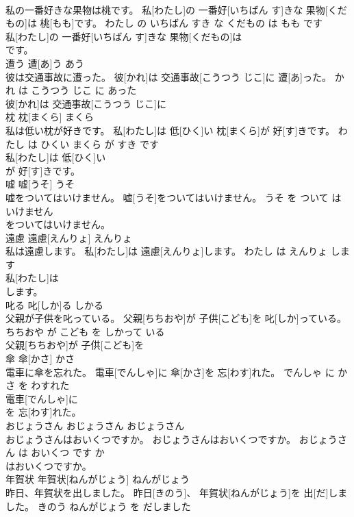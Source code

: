 \documentclass[8pt]{extreport}
\begin{document}
\begin{CJK}{UTF8}{min}
\\	私の一番好きな果物は桃です。	私[わたし]の 一番好[いちばん す]きな 果物[くだもの]は 桃[もも]です。	わたし の いちばん すき な くだもの は もも です	
\\	私[わたし]の 一番好[いちばん す]きな 果物[くだもの]は
\\	です。		
\\	遭う	遭[あ]う	あう	
\\	彼は交通事故に遭った。	彼[かれ]は 交通事故[こうつう じこ]に 遭[あ]った。	かれ は こうつう じこ に あった	
\\	彼[かれ]は 交通事故[こうつう じこ]に
\\	枕	枕[まくら]	まくら	
\\	私は低い枕が好きです。	私[わたし]は 低[ひく]い 枕[まくら]が 好[す]きです。	わたし は ひくい まくら が すき です	
\\	私[わたし]は 低[ひく]い
\\	が 好[す]きです。		
\\	嘘	嘘[うそ]	うそ	
\\	嘘をついてはいけません。	嘘[うそ]をついてはいけません。	うそ を ついて は いけません	
\\	をついてはいけません。		
\\	遠慮	遠慮[えんりょ]	えんりょ	
\\	私は遠慮します。	私[わたし]は 遠慮[えんりょ]します。	わたし は えんりょ します	
\\	私[わたし]は
\\	します。		
\\	叱る	叱[しか]る	しかる	
\\	父親が子供を叱っている。	父親[ちちおや]が 子供[こども]を 叱[しか]っている。	ちちおや が こども を しかって いる	
\\	父親[ちちおや]が 子供[こども]を
\\	傘	傘[かさ]	かさ	
\\	電車に傘を忘れた。	電車[でんしゃ]に 傘[かさ]を 忘[わす]れた。	でんしゃ に かさ を わすれた	
\\	電車[でんしゃ]に
\\	を 忘[わす]れた。		
\\	おじょうさん	おじょうさん	おじょうさん	
\\	おじょうさんはおいくつですか。	おじょうさんはおいくつですか。	おじょうさん は おいくつ です か	
\\	はおいくつですか。		
\\	年賀状	年賀状[ねんがじょう]	ねんがじょう	
\\	昨日、年賀状を出しました。	昨日[きのう]、 年賀状[ねんがじょう]を 出[だ]しました。	きのう ねんがじょう を だしました	

\end{CJK}
\end{document}
